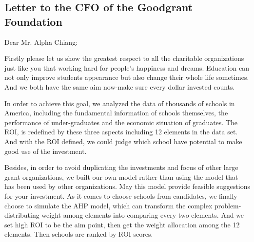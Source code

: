 
\newpage
\normalsize
\begin{appendices}

\section{Letter to the CFO of the Goodgrant Foundation}
  Dear Mr. Alpha Chiang:

Firstly please let us show the greatest respect to all the charitable organizations just like you that working hard for people's happiness and dreams. Education can not only improve students appearance but also change their whole life sometimes. And we both have the same aim now-make sure every dollar invested counts.

In order to achieve this goal, we analyzed the data of thousands of schools in America, including the fundamental information of schools themselves, the performance of under-graduates and the economic situation of graduates. The ROI, is redefined by these three aspects including 12 elements in the data set. And with the ROI defined, we could judge which school have potential to make good use of the investment.

Besides, in order to avoid duplicating the investments and focus of other large grant organizations, we built our own model rather than using the model that has been used by other organizations. May this model provide feasible suggestions for your investment.
As it comes to choose schools from candidates, we finally choose to simulate the AHP model, which can transform the complex problem-distributing weight among elements into comparing every two elements. And we set high ROI to be the aim point, then get the weight allocation among the 12 elements. Then schools are ranked by ROI scores.


\end{appendices}
